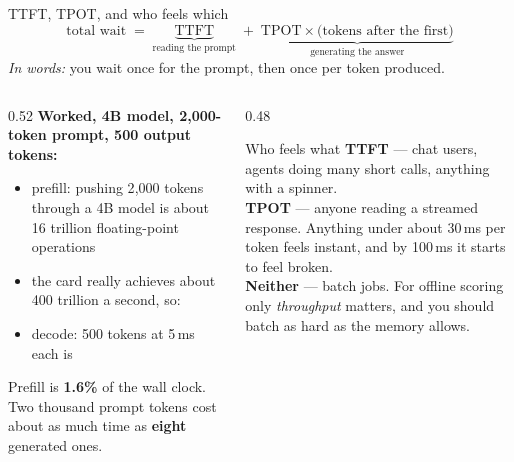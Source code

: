 \documentclass[aspectratio=169,10pt]{beamer}
\begin{document}
\begin{frame}[shrink=4]{TTFT, TPOT, and who feels which}
  \[
    \text{total wait} \;=\;
    \underbrace{\mathrm{TTFT}}_{\text{reading the prompt}} \;+\;
    \underbrace{\mathrm{TPOT} \times \text{(tokens after the first)}}
               _{\text{generating the answer}}
  \]
  \emph{In words:} you wait once for the prompt, then once per token produced.
  \begin{columns}[T]
    \begin{column}{0.52\textwidth}
      \textbf{Worked, 4B model, 2{,}000-token prompt, 500 output tokens:}
      \small
      \begin{itemize}
        \item prefill: pushing 2{,}000 tokens through a 4B model is about
          16 trillion floating-point operations
        \item the card really achieves about 400 trillion a second, so:
        \item decode: 500 tokens at 5\,ms each is 
      \end{itemize}
      \vspace{0.4em}
      Prefill is \textbf{1.6\%} of the wall clock. Two thousand prompt tokens
      cost about as much time as \textbf{eight} generated ones.
    \end{column}
    \begin{column}{0.48\textwidth}
      \begin{block}{Who feels what}
        \small
        \textbf{TTFT} --- chat users, agents doing many short calls,
        anything with a spinner.\\[0.3em]
        \textbf{TPOT} --- anyone reading a streamed response. Anything under
        about 30\,ms per token feels instant, and by 100\,ms it starts to feel
        broken.\\[0.3em]
        \textbf{Neither} --- batch jobs. For offline scoring only
        \emph{throughput} matters, and you should batch as hard as the memory
        allows.
      \end{block}
    \end{column}
  \end{columns}
\end{frame}
\end{document}
